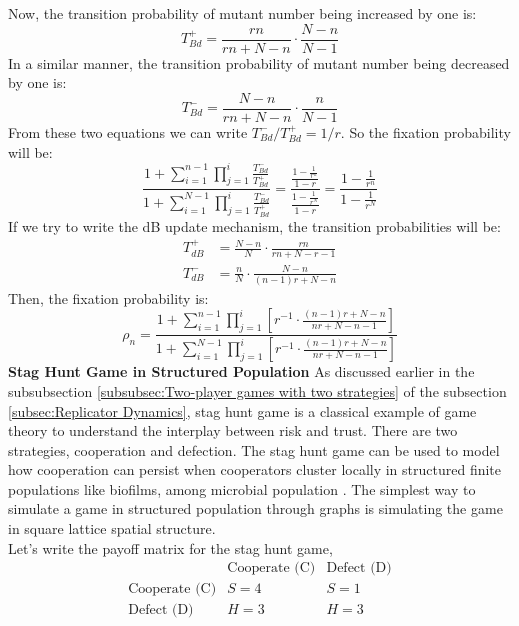 \documentclass{article}
\begin{document}
Now, the transition probability of mutant number being increased by one is:
\begin{equation}
T_{Bd}^+ = \frac{rn}{rn+ N-n} \cdot \frac{N-n}{N-1} \label{eq:50}
\end{equation}
In a similar manner, the transition probability of mutant number being decreased by one is:
\begin{equation}
T_{Bd}^- = \frac{N-n}{rn+ N-n} \cdot \frac{n}{N-1} \label{eq:51}
\end{equation}
From these two equations we can write $T_{Bd}^-/T_{Bd}^+ = 1/r$. So the fixation probability will be:
\begin{equation}
\frac{1+\sum_{i=1}^{n-1}\prod_{j=1}^i \frac{T_{Bd}^-}{T_{Bd}^+}}{1+ \sum_{i=1}^{N-1}\prod_{j=1}^i \frac{T_{Bd}^-}{T_{Bd}^+}} = \frac{\frac{1-\frac{1}{r^n}}{1-r}} {\frac{1-\frac{1}{r^N}}{1-r}} = \frac{1-\frac{1}{r^n}}{1-\frac{1}{r^N}} \label{eq:52}
\end{equation}
If we try to write the dB update mechanism, the transition probabilities will be:
\begin{align}
T_{dB}^+ &= \frac{N-n}{N} \cdot \frac{rn}{rn+N-r-1} \nonumber\\
T_{dB}^- &= \frac{n}{N} \cdot \frac{N-n}{(n-1)r + N-n} \label{eq:53}
\end{align}
Then, the fixation probability is:
\begin{equation}
\rho_n = \frac{1 + \sum_{i=1}^{n-1} \prod_{j=1}^i[ r^{-1} \cdot \frac{(n-1)r + N - n}{n r + N - n - 1}]}{1 + \sum_{i=1}^{N-1} \prod_{j=1}^i[ r^{-1} \cdot \frac{(n-1)r + N - n}{n r + N - n - 1}]} \label{eq:54}
\end{equation}
\newline
\textbf{Stag Hunt Game in Structured Population}
\newline
As discussed earlier in the subsubsection \ref{subsubsec:Two-player games with two strategies} of the subsection \ref{subsec:Replicator Dynamics}, stag hunt game is a classical example of game theory to understand the interplay between risk and trust. There are two strategies, cooperation and defection. The stag hunt game can be used to model how cooperation can persist when cooperators cluster locally in structured finite populations like biofilms, among microbial population \citep{Lambert2014}. 
The simplest way to simulate a game in structured population through graphs is simulating the game in square lattice spatial structure.\\
Let's write the payoff matrix for the stag hunt game,
\begin{equation}
\begin{array}{c|cc}
   & \text{Cooperate (C)} & \text{Defect (D)} \\
  \hline
  \text{Cooperate (C)} & S = 4 & S = 1 \\
  \text{Defect (D)} & H = 3 & H = 3 \\
\end{array} \label{eq:55}
\end{equation}
\end{document}

